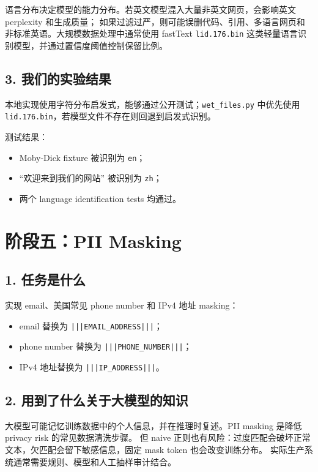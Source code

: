 \documentclass[UTF8,11pt]{ctexart}
\begin{document}
语言分布决定模型的能力分布。若英文模型混入大量非英文网页，会影响英文 perplexity 和生成质量；
如果过滤过严，则可能误删代码、引用、多语言网页和非标准英语。大规模数据处理中通常使用 fastText
\texttt{lid.176.bin} 这类轻量语言识别模型，并通过置信度阈值控制保留比例。

\subsection*{3. 我们的实验结果}

本地实现使用字符分布启发式，能够通过公开测试；\texttt{wet\_files.py} 中优先使用
\texttt{lid.176.bin}，若模型文件不存在则回退到启发式识别。

测试结果：

\begin{itemize}
  \item Moby-Dick fixture 被识别为 \texttt{en}；
  \item ``欢迎来到我们的网站'' 被识别为 \texttt{zh}；
  \item 两个 language identification tests 均通过。
\end{itemize}

\section{阶段五：PII Masking}

\subsection*{1. 任务是什么}

实现 email、美国常见 phone number 和 IPv4 地址 masking：

\begin{itemize}
  \item email 替换为 \texttt{|||EMAIL\_ADDRESS|||}；
  \item phone number 替换为 \texttt{|||PHONE\_NUMBER|||}；
  \item IPv4 地址替换为 \texttt{|||IP\_ADDRESS|||}。
\end{itemize}

\subsection*{2. 用到了什么关于大模型的知识}

大模型可能记忆训练数据中的个人信息，并在推理时复述。PII masking 是降低 privacy risk 的常见数据清洗步骤。
但 naive 正则也有风险：过度匹配会破坏正常文本，欠匹配会留下敏感信息，固定 mask token 也会改变训练分布。
实际生产系统通常需要规则、模型和人工抽样审计结合。
\end{document}

